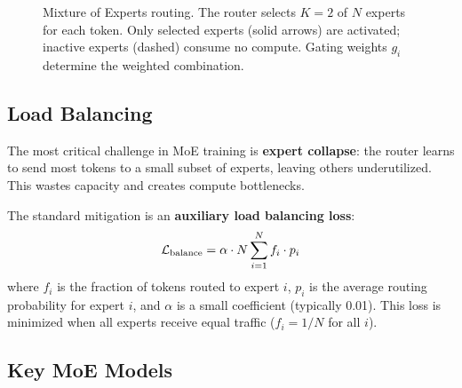 \begin{figure}[H]
\caption{Mixture of Experts routing.  The router selects $K{=}2$ of $N$
experts for each token.  Only selected experts (solid arrows) are activated;
inactive experts (dashed) consume no compute.  Gating weights $g_i$ determine
the weighted combination.}
\label{fig:moe_routing}
\end{figure}

\subsection{Load Balancing}

The most critical challenge in MoE training is \textbf{expert collapse}: the
router learns to send most tokens to a small subset of experts, leaving
others underutilized.  This wastes capacity and creates compute bottlenecks.

The standard mitigation is an \textbf{auxiliary load balancing loss}:
\begin{equation}
\mathcal{L}_{\text{balance}} = \alpha \cdot N \sum_{i=1}^{N} f_i \cdot p_i
\label{eq:load_balance}
\end{equation}
where $f_i$ is the fraction of tokens routed to expert $i$, $p_i$ is the
average routing probability for expert $i$, and $\alpha$ is a small
coefficient (typically 0.01).  This loss is minimized when all experts
receive equal traffic ($f_i = 1/N$ for all $i$).

\subsection{Key MoE Models}

